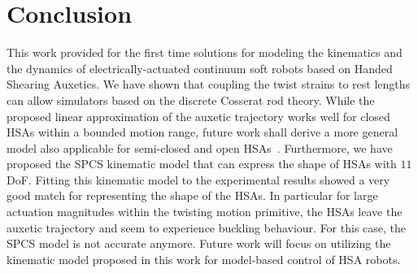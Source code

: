 \section{Conclusion}\label{sec:hsamodel:conclusion}
%
This work provided for the first time solutions for modeling the kinematics and the dynamics of electrically-actuated continuum soft robots based on Handed Shearing Auxetics.
%
We have shown that coupling the twist strains to rest lengths can allow simulators based on the discrete Cosserat rod theory. %
While the proposed linear approximation of the auxetic trajectory works well for closed \glspl{HSA} within a bounded motion range, future work shall derive a more general model also applicable for semi-closed and open \glspl{HSA}~\cite{good2022expanding}.
Furthermore, we have proposed the \gls{SPCS} kinematic model that can express the shape of \glspl{HSA} with $11$ DoF.
Fitting this kinematic model to the experimental results showed a very good match for representing the shape of the \glspl{HSA}. In particular for large actuation magnitudes within the twisting motion primitive, the \glspl{HSA} leave the auxetic trajectory and seem to experience buckling behaviour. For this case, the \gls{SPCS} model is not accurate anymore.
Future work will focus on utilizing the kinematic model proposed in this work for model-based control of \gls{HSA} robots.